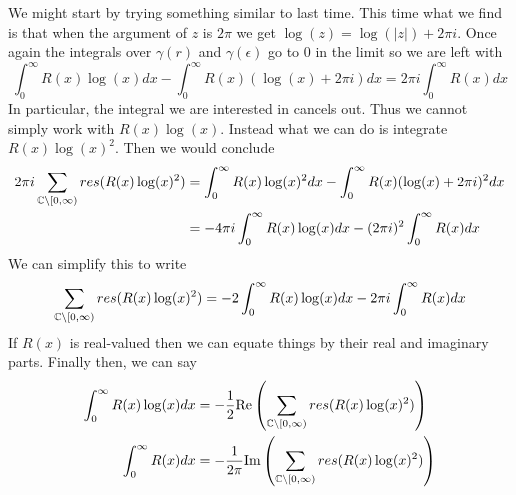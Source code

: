 We might start by trying something similar to last time. This time what we find is that when the argument of $z$ is $2\pi$ we get $\log(z) = \log(|z|) + 2\pi i$. Once again the integrals over $\gamma(r)$ and $\gamma(\epsilon)$ go to 0 in the limit so we are left with 
$$\int_0^\infty R(x) \log(x) dx - \int_0^\infty R(x) (\log(x) + 2\pi i) dx = 2\pi i \int_0^\infty R(x)dx $$
In particular, the integral we are interested in cancels out. Thus we cannot simply work with $R(x) \log(x)$. Instead what we can do is integrate $R(x) \log(x)^2$. Then we would conclude
\begin{align*}
     2\pi i \sum_{\mathbb{C} \setminus [0, \infty)} res(R(x) \log(x)^2) &= \int_0^\infty R(x) \log(x)^2 dx - \int_0^\infty R(x) (\log(x) + 2\pi i)^2 dx\\
     &= -4\pi i \int_0^\infty R(x) \log(x) dx - (2\pi i)^2 \int_0^\infty R(x) dx 
\end{align*}
We can simplify this to write
$$ \sum_{\mathbb{C} \setminus [0, \infty)} res(R(x) \log(x)^2) = -2 \int_0^\infty R(x) \log(x) dx - 2\pi i \int_0^\infty R(x) dx $$
If $R(x)$ is real-valued then we can equate things by their real and imaginary parts. Finally then, we can say
\begin{align*}
    \int_0^\infty R(x) \log(x) dx &= -\frac{1}{2} \text{Re}\left(\sum_{\mathbb{C} \setminus [0, \infty)} res(R(x) \log(x)^2)\right)\\
    \int_0^\infty R(x) dx &= -\frac{1}{2\pi} \text{Im}\left(\sum_{\mathbb{C} \setminus [0, \infty)} res(R(x) \log(x)^2)\right)
\end{align*}
